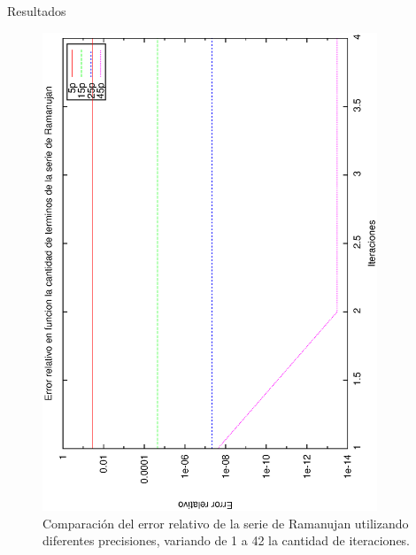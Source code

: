 \begin{section}{Resultados}
	\VSP

	\begin{figure}[H]
	  \centering
		\includegraphics[width=10cm,angle=-90]{graficos/ramanujan_1a42it.eps}
	  \caption{Comparación del error relativo de la serie de Ramanujan utilizando diferentes precisiones, variando de 1 a 42 la cantidad de iteraciones.}
	  \label{fig:ramanujan_42it}
	\end{figure}
	
	\VSP	


\end{section}
